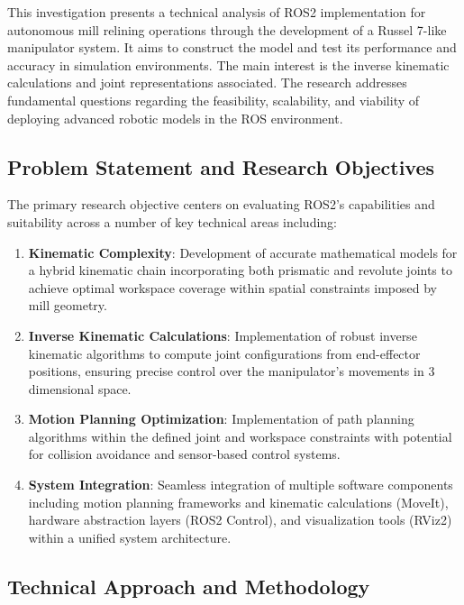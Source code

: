 \documentclass[10pt,a4paper,english]{article}
\begin{document}
This investigation presents a technical analysis of ROS2 implementation for autonomous mill relining operations through the development of a Russel 7-like manipulator system. It aims to construct the model and test its performance and accuracy in simulation environments. The main interest is the inverse kinematic calculations and joint representations associated. The research addresses fundamental questions regarding the feasibility, scalability, and viability of deploying advanced robotic models in the ROS environment. \par

\subsection{Problem Statement and Research Objectives}

The primary research objective centers on evaluating ROS2's capabilities and suitability across a number of key technical areas including:

\begin{enumerate}
    \item \textbf{Kinematic Complexity}: Development of accurate mathematical models for a hybrid kinematic chain incorporating both prismatic and revolute joints to achieve optimal workspace coverage within spatial constraints imposed by mill geometry.

    \item \textbf{Inverse Kinematic Calculations}: Implementation of robust inverse kinematic algorithms to compute joint configurations from end-effector positions, ensuring precise control over the manipulator's movements in 3 dimensional space.

    \item \textbf{Motion Planning Optimization}: Implementation of path planning algorithms within the defined joint and workspace constraints with potential for collision avoidance and sensor-based control systems.
    
    \item \textbf{System Integration}: Seamless integration of multiple software components including motion planning frameworks and kinematic calculations (MoveIt), hardware abstraction layers (ROS2 Control), and visualization tools (RViz2) within a unified system architecture.
\end{enumerate}

\subsection{Technical Approach and Methodology}
\end{document}

